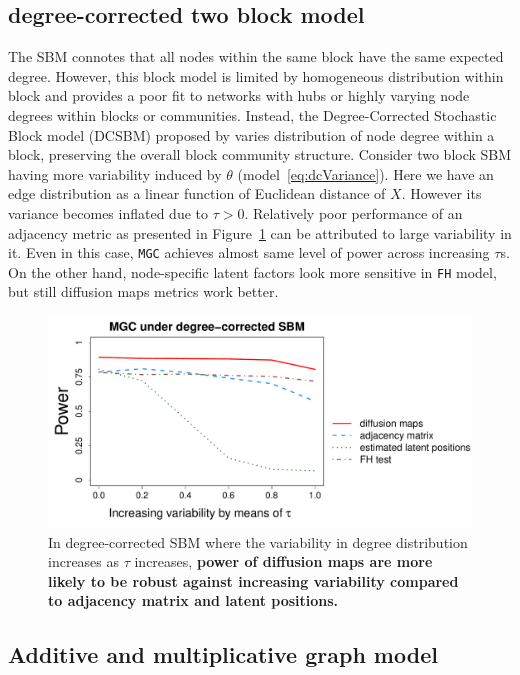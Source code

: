 \documentclass[12pt]{article}
\theoremstyle{definition}
\begin{document}
\subsection{degree-corrected two block model}

The SBM connotes that all nodes within the same block have the same expected degree. However, this block model is limited by homogeneous distribution within block and provides a poor fit to networks with hubs or highly varying node degrees within blocks or communities. Instead, the Degree-Corrected Stochastic Block model (DCSBM) proposed by \cite{karrer2011stochastic} varies distribution of node degree within a block, preserving the overall block community structure. Consider two block SBM having more variability induced by $\theta$ (model~\ref{eq:dcVariance}). Here we have an edge distribution as a linear function of Euclidean distance of $X$. However its variance becomes inflated due to $\tau > 0$. Relatively poor performance of an adjacency metric as presented in Figure~\ref{fig:dcSBM} can be attributed to large variability in it. Even in this case, \texttt{MGC} achieves almost same level of power across increasing $\tau$s. On the other hand, node-specific latent factors look more sensitive in \texttt{FH} model, but still diffusion maps metrics work better.

\begin{figure}[h]
	\centering
	\includegraphics[width=0.8\linewidth, height = 0.4\linewidth]{../Figure/powerplot_var_simple.pdf}
	\caption{In degree-corrected SBM where the variability in degree distribution increases as $\tau$ increases, \textbf{power of diffusion maps are more likely to be robust against increasing variability compared to adjacency matrix and latent positions.}}
	\label{fig:dcSBM}
\end{figure}	


	
\subsection{Additive and multiplicative graph model}
\end{document}

